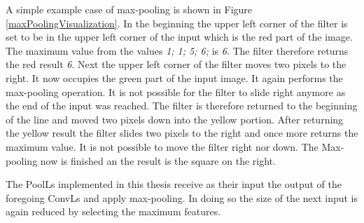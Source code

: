 A simple example case of max-pooling is shown in Figure \ref{maxPoolingVisualization}. In the beginning the upper left corner of the filter is set to be in the upper left corner of the input which is the red part of the image. The maximum value from the values \textit{1; 1; 5; 6;} is \textit{6}. The filter therefore returns the red result \textit{6}. Next the upper left corner of the filter moves two pixels to the right. It now occupies the green part of the input image. It again performs the max-pooling operation. It is not possible for the filter to slide right anymore as the end of the input was reached. The filter is therefore returned to the beginning of the line and moved two pixels down into the yellow portion. After returning the yellow result the filter slides two pixels to the right and once more returns the maximum value. It is not possible to move the filter right nor down. The Max-pooling now is finished an the result is the square on the right.

The PoolLs implemented in this thesis receive as their input the output of the foregoing ConvLs and apply max-pooling. In doing so the size of the next input is again reduced by selecting the maximum features.

